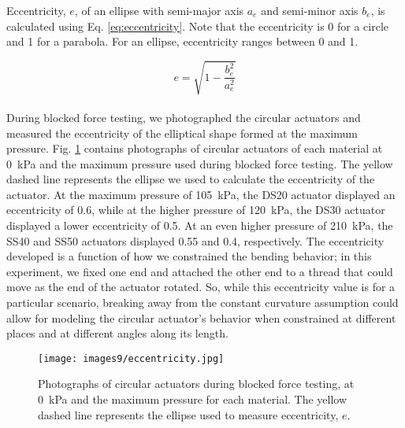 Eccentricity, $e$, of an ellipse with semi-major axis $a_e$ and semi-minor axis $b_e$, is calculated using Eq. \ref{eq:eccentricity}. Note that the eccentricity is 0 for a circle and 1 for a parabola. For an ellipse, eccentricity ranges between 0 and 1. 

\begin{equation}
    e = \sqrt{1-\frac{b_e^2}{a_e^2}}
    \label{eq:eccentricity}
\end{equation}
\\
During blocked force testing, we photographed the circular actuators and measured the eccentricity of the elliptical shape formed at the maximum pressure. Fig. \ref{fig:eccentricity} contains photographs of circular actuators of each material at 0~kPa and the maximum pressure used during blocked force testing. The yellow dashed line represents the ellipse we used to calculate the eccentricity of the actuator. At the maximum pressure of 105~kPa, the DS20 actuator displayed an eccentricity of 0.6, while at the higher pressure of 120~kPa, the DS30 actuator displayed a lower eccentricity of 0.5. At an even higher pressure of 210~kPa, the SS40 and SS50 actuators displayed 0.55 and 0.4, respectively. The eccentricity developed is a function of how we constrained the bending behavior; in this experiment, we fixed one end and attached the other end to a thread that could move as the end of the actuator rotated. So, while this eccentricity value is for a particular scenario, breaking away from the constant curvature assumption could allow for modeling the circular actuator's behavior when constrained at different places and at different angles along its length.
\\
\begin{figure}[ht]
    \centering
     \texttt{[image: images9/eccentricity.jpg]}
    \caption{Photographs of circular actuators during blocked force testing, at 0~kPa and the maximum pressure for each material. The yellow dashed line represents the ellipse used to measure eccentricity, $e$.}
    \label{fig:eccentricity}
\end{figure}